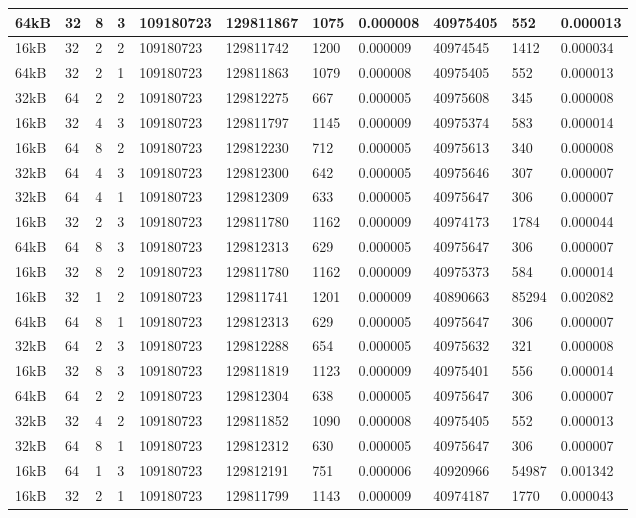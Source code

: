 \documentclass[conference]{IEEEtran}
\begin{document}
\begin{table}
\begin{tabular}{|m{.75cm} |m{.75cm} |m{.8cm} | m{.75cm} | l | l | l | l | l | l | l |}
64kB&	32&	8&	3&	109180723&	129811867&	1075&	0.000008	&40975405	  &552	  &0.000013 \\ \hline
16kB&	32&	2&	2&	109180723&	129811742&	1200&	0.000009	&40974545	 & 1412	&0.000034 \\ \hline
64kB&	32&	2&	1&	109180723&	129811863&	1079&	0.000008	&40975405	  &552	  &0.000013 \\ \hline
32kB&	64&	2&	2&	109180723&	129812275&	667	&  0.000005&	40975608	&345	  &0.000008 \\ \hline
16kB&	32&	4&	3&	109180723&	129811797&	1145&	0.000009	&40975374	  &583	  &0.000014 \\ \hline
16kB&	64&	8&	2&	109180723&	129812230&	712	&  0.000005&	40975613	&340	  &0.000008 \\ \hline
32kB&	64&	4&	3&	109180723&	129812300&	642	&  0.000005&	40975646	&307	  &0.000007 \\ \hline
32kB&	64&	4&	1&	109180723&	129812309&	633	&  0.000005&	40975647	&306	  &0.000007 \\ \hline
16kB&	32&	2&	3&	109180723&	129811780&	1162&	0.000009	&40974173	 & 1784	&0.000044 \\ \hline
64kB&	64&	8&	3&	109180723&	129812313&	629	&  0.000005&	40975647	&306	  &0.000007 \\ \hline
16kB&	32&	8&	2&	109180723&	129811780&	1162&	0.000009	&40975373	  &584	  &0.000014 \\ \hline
16kB&	32&	1&	2&	109180723&	129811741&	1201&	0.000009	&40890663	  &85294	&0.002082 \\ \hline
64kB&	64&	8&	1&	109180723&	129812313&	629	&  0.000005&	40975647	&306	  &0.000007 \\ \hline
32kB&	64&	2&	3&	109180723&	129812288&	654	&  0.000005&	40975632	&321	  &0.000008 \\ \hline
16kB&	32&	8&	3&	109180723&	129811819&	1123&	0.000009	&40975401	  &556	  &0.000014 \\ \hline
64kB&	64&	2&	2&	109180723&	129812304&	638	&  0.000005&	40975647	&306	  &0.000007 \\ \hline
32kB&	32&	4&	2&	109180723&	129811852&	1090&	0.000008	&40975405	  &552	  &0.000013 \\ \hline
32kB&	64&	8&	1&	109180723&	129812312&	630	&  0.000005&	40975647	&306	  &0.000007 \\ \hline
16kB&	64&	1&	3&	109180723&	129812191&	751	&  0.000006&	40920966	&54987	&0.001342 \\ \hline
16kB&	32&	2&	1&	109180723&	129811799&	1143&	0.000009	&40974187	 & 1770	&0.000043 \\ \hline

\end{tabular}
\end{table}
\end{document}
